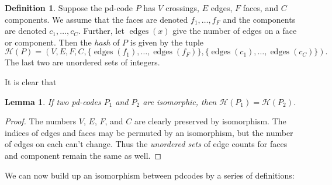 \documentclass[amsmath,secnumarabic,floatfix,amssymb,nofootinbib,nobibnotes,letterpaper,11pt,tightenlines,showkeys]{revtex4}
\newtheorem{lemma}[theorem]{Lemma}
\theoremstyle{definition}
\newtheorem{definition}[theorem]{Definition}
\newcommand{\pdcode}{pd-code }
\newcommand{\pdcodes}{pd-codes }
\newcommand{\edges}{\operatorname{edges}}
\begin{document}
\begin{definition}
Suppose the \pdcode $P$ has $V$ crossings, $E$ edges, $F$ faces, and $C$ components. We assume that the faces are denoted $f_1, \dots, f_F$ and the components are denoted $c_1, \dots, c_C$. Further, let $\edges(x)$ give the number of edges on a face or component. Then the \emph{hash} of $P$ is given by the tuple
\begin{equation*}
\mathcal{H}(P) = (V,E,F,C,\{ \edges(f_1), \dots, \edges(f_F) \},
 \{ \edges(c_1), \dots, \edges(c_C) \}).
\end{equation*}
The last two are unordered sets of integers.
\end{definition}

It is clear that
\begin{lemma}
If two \pdcodes $P_1$ and $P_2$ are isomorphic, then $\mathcal{H}(P_1) = \mathcal{H}(P_2)$.
\end{lemma}

\begin{proof}
The numbers $V$, $E$, $F$, and $C$ are clearly preserved by isomorphism. The indices of edges and faces may be permuted by an isomorphism, but the number of edges on each can't change. Thus the \emph{unordered sets} of edge counts for faces and component remain the same as well.
\end{proof}

We can now build up an isomorphism between pdcodes by a series of definitions:
\end{document}
